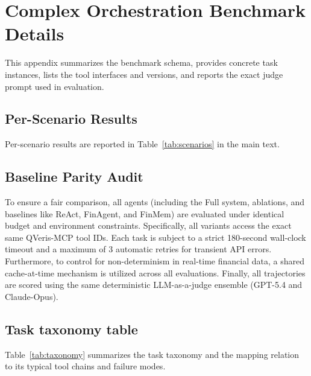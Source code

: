 \documentclass{article}
\begin{document}
\section{Complex Orchestration Benchmark Details}
This appendix summarizes the benchmark schema, provides concrete task instances, lists the tool interfaces and versions, and reports the exact judge prompt used in evaluation.

\subsection{Per-Scenario Results}

Per-scenario results are reported in Table~\ref{tab:scenarios} in the main text.

\subsection{Baseline Parity Audit}
To ensure a fair comparison, all agents (including the Full system, ablations, and baselines like ReAct, FinAgent, and FinMem) are evaluated under identical budget and environment constraints. Specifically, all variants access the exact same QVeris-MCP tool IDs. Each task is subject to a strict 180-second wall-clock timeout and a maximum of 3 automatic retries for transient API errors. Furthermore, to control for non-determinism in real-time financial data, a shared cache-at-time mechanism is utilized across all evaluations. Finally, all trajectories are scored using the same deterministic LLM-as-a-judge ensemble (GPT-5.4 and Claude-Opus).

\subsection{Task taxonomy table}
Table~\ref{tab:taxonomy} summarizes the task taxonomy and the mapping relation to its typical tool chains and failure modes.
\end{document}
